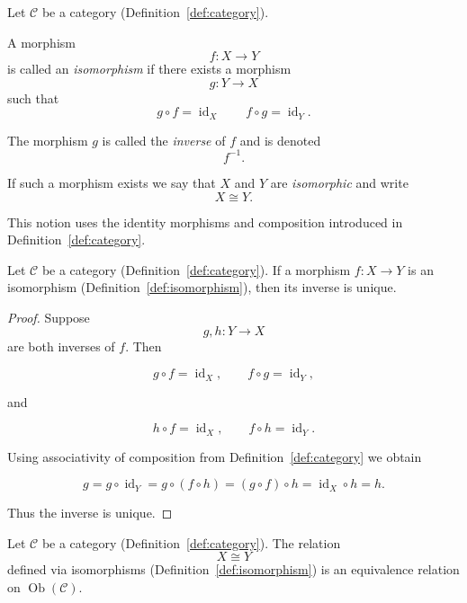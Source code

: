 \begin{definition}[Isomorphism]
\label{def:isomorphism}

Let $\mathcal{C}$ be a category (Definition~\ref{def:category}).  

A morphism
$$
f : X \to Y
$$
is called an \emph{isomorphism} if there exists a morphism
$$
g : Y \to X
$$
such that
$$
g \circ f = \operatorname{id}_X
\qquad
f \circ g = \operatorname{id}_Y.
$$

The morphism $g$ is called the \emph{inverse} of $f$ and is denoted
$$
f^{-1}.
$$

If such a morphism exists we say that $X$ and $Y$ are \emph{isomorphic} and write
$$
X \cong Y.
$$

This notion uses the identity morphisms and composition introduced in
Definition~\ref{def:category}.
\end{definition}


\begin{proposition}
\label{prop:inverse-unique}

Let $\mathcal{C}$ be a category (Definition~\ref{def:category}).  
If a morphism $f : X \to Y$ is an isomorphism (Definition~\ref{def:isomorphism}),
then its inverse is unique.
\end{proposition}

\begin{proof}

Suppose
$$
g,h : Y \to X
$$
are both inverses of $f$. Then

$$
g \circ f = \operatorname{id}_X,
\qquad
f \circ g = \operatorname{id}_Y,
$$

and

$$
h \circ f = \operatorname{id}_X,
\qquad
f \circ h = \operatorname{id}_Y.
$$

Using associativity of composition from Definition~\ref{def:category} we obtain

$$
g
=
g \circ \operatorname{id}_Y
=
g \circ (f \circ h)
=
(g \circ f) \circ h
=
\operatorname{id}_X \circ h
=
h.
$$

Thus the inverse is unique.
\end{proof}


\begin{corollary}
\label{cor:iso-equivalence-relation}

Let $\mathcal{C}$ be a category (Definition~\ref{def:category}).  
The relation
$$
X \cong Y
$$
defined via isomorphisms (Definition~\ref{def:isomorphism})
is an equivalence relation on $\operatorname{Ob}(\mathcal{C})$.
\end{corollary}

